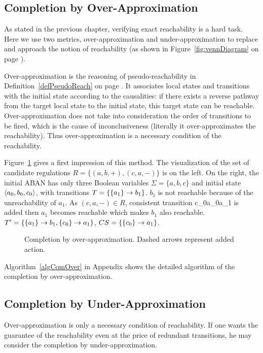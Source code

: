 \subsection{Completion by Over-Approximation}
As stated in the previous chapter, verifying exact reachability is a hard task.
Here we use two metrics, over-approximation and under-approximation to replace and approach the notion of reachability (as shown in Figure~\ref{fig:vennDiagram} on page \pageref{fig:vennDiagram}).

Over-approximation is the reasoning of pseudo-reachability in Definition~\ref{defPseudoReach} on page \pageref{defPseudoReach}. 
It associates local states and transitions with the initial state according to the causalities: if there exists a reverse pathway from the target local state to the initial state, this target state can be reachable.
Over-approximation does not take into consideration the order of transitions to be fired, which is the cause of inconclusiveness (literally it over-approximates the reachability).
Thus over-approximation is a necessary condition of the reachability.

Figure~\ref{CompOv} gives a first impression of this method.
The visualization of the set of candidate regulations $R=\{(a,b,+),(c,a,-)\}$ is on the left.
On the right, the initial ABAN has only three Boolean variables $\Sigma=\{a,b,c\}$ and initial state $\init{a_0,b_0,c_0}$, with transitions $T=\{\acm{a_1}{b_0}{b_1}\}$.
$b_1$ is not reachable because of the unreachability of $a_1$.
As $(c,a,-)\in R$, consistent transition \ac{c_0}{a_0}{a_1} is added then $a_1$ becomes reachable which makes $b_1$ also reachable.
$T'=\{\acm{a_1}{b_0}{b_1},\acm{c_0}{a_0}{a_1}\}$, $CS=\{\acm{c_0}{a_0}{a_1}\}$.

\begin{figure}[ht]
\centering

\caption[Completion by over-approximation]{Completion by over-approximation. Dashed arrows represent added action.}\label{CompOv}
\end{figure}
Algorithm~\ref{algComOver} in Appendix shows the detailed algorithm of the completion by over-approximation.

\subsection{Completion by Under-Approximation}\label{sec:completionUnder}
Over-approximation is only a necessary condition of reachability.
If one wants the guarantee of the reachability even at the price of redundant transitions, he may consider the completion by under-approximation.

